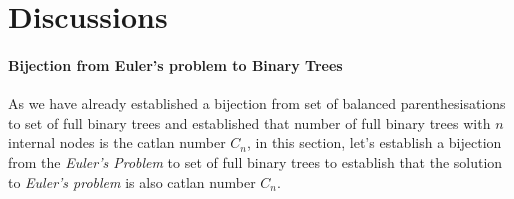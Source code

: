 
\section{Discussions}

\paragraph{Bijection from Euler's problem to Binary Trees} As we have already established a bijection from set of balanced parenthesisations to set of full binary trees and established that number of full binary trees with $n$ internal nodes is the catlan number $C_n$, in this section, let's establish a bijection from the \emph{Euler's Problem} to set of full binary trees to establish that the solution to \emph{Euler's problem} is also catlan number $C_n$.

